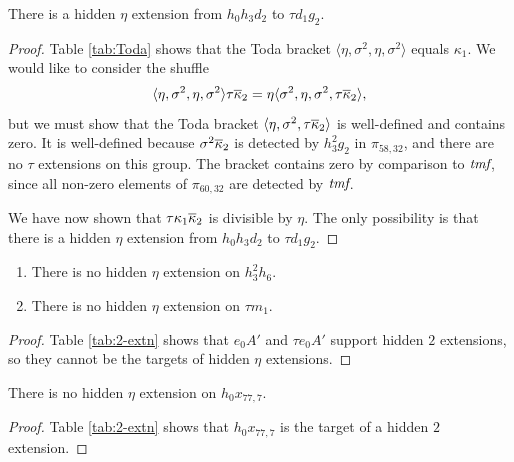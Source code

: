 \begin{lemma}
\label{lem:eta-h0h3d2}
There is a hidden $\eta$ extension from $h_0 h_3 d_2$ 
to $\tau d_1 g_2$.
\end{lemma}

\begin{proof}
Table \ref{tab:Toda} shows that the Toda bracket
$\langle \eta, \sigma^2, \eta, \sigma^2 \rangle$
equals $\kappa_1$.
We would like to consider the shuffle
\[
\langle \eta, \sigma^2, \eta, \sigma^2 \rangle \tau \overline{\kappa}_2 =
\eta \langle \sigma^2, \eta, \sigma^2, \tau \overline{\kappa}_2 \rangle,
\]
but we must show that the Toda bracket
$\langle \eta, \sigma^2, \tau \overline{\kappa}_2 \rangle$ is well-defined and
contains zero.
It is well-defined because $\sigma^2 \overline{\kappa}_2$ is detected by
$h_3^2 g_2$ in $\pi_{58,32}$, and there are no $\tau$ extensions
on this group.
The bracket contains zero by comparison to $\textit{tmf}$, since
all non-zero elements of $\pi_{60,32}$ are detected
by $\textit{tmf}$.

We have now shown that $\tau \kappa_1 \overline{\kappa}_2$ is divisible
by $\eta$.  The only possibility is that 
there is a hidden $\eta$ extension from $h_0 h_3 d_2$ to
$\tau d_1 g_2$.
\end{proof}

\begin{lemma}
\label{lem:eta-tm1}
\mbox{}
\begin{enumerate}
\item
{}
There is no hidden $\eta$ extension on $h_3^2 h_6$.
\item
{}
There is no hidden $\eta$ extension on $\tau m_1$.
\end{enumerate}
\end{lemma}

\begin{proof}
Table \ref{tab:2-extn} shows that $e_0 A'$ and $\tau e_0 A'$ support hidden $2$ extensions, so they cannot be the targets of hidden
$\eta$ extensions.
\end{proof}

\begin{lemma}
\label{lem:eta-h0x77,7}
There is no hidden $\eta$ extension on $h_0 x_{77,7}$.
\end{lemma}

\begin{proof}
Table \ref{tab:2-extn} shows that $h_0 x_{77,7}$ is the target
of a hidden $2$ extension.
\end{proof}

